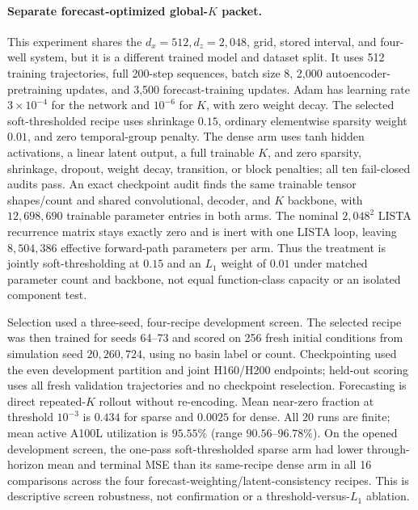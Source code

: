 \paragraph{Separate forecast-optimized global-$K$ packet.}
This experiment shares the $d_x=512,d_z=2{,}048$, grid, stored interval, and
four-well system, but it is a different trained model and dataset split. It
uses 512 training trajectories, full 200-step sequences, batch size 8, 2,000
autoencoder-pretraining updates, and 3,500 forecast-training updates. Adam has
learning rate $3\times10^{-4}$ for the network and $10^{-6}$ for $K$, with
zero weight decay. The selected soft-thresholded recipe uses shrinkage $0.15$, ordinary
elementwise sparsity weight $0.01$, and zero temporal-group penalty. The dense
arm uses tanh hidden activations, a linear latent output, a full trainable $K$,
and zero sparsity, shrinkage, dropout, weight decay, transition, or block
penalties; all ten fail-closed audits pass. An exact checkpoint audit finds
the same trainable tensor shapes/count and shared convolutional, decoder, and
$K$ backbone, with $12{,}698{,}690$ trainable parameter entries in both arms.
The nominal $2{,}048^2$ LISTA recurrence matrix stays exactly zero and is inert
with one LISTA loop, leaving $8{,}504{,}386$ effective forward-path parameters
per arm. Thus the treatment is jointly soft-thresholding at $0.15$ and an
$L_1$ weight of $0.01$ under matched parameter count and backbone, not equal
function-class capacity or an isolated component test.

Selection used a three-seed, four-recipe development screen. The selected
recipe was then trained for seeds 64--73 and scored on 256 fresh initial
conditions from simulation seed $20{,}260{,}724$, using no basin label or
count. Checkpointing used the even development partition and joint H160/H200
endpoints; held-out scoring uses all fresh validation trajectories and no
checkpoint reselection. Forecasting is direct
repeated-$K$ rollout without re-encoding. Mean near-zero fraction at threshold
$10^{-3}$ is $0.434$ for sparse and $0.0025$ for dense. All 20 runs are finite;
mean active A100L utilization is $95.55\%$ (range $90.56$--$96.78\%$).
On the opened development screen, the one-pass soft-thresholded sparse arm had lower through-horizon mean
and terminal MSE than its same-recipe dense arm in all 16 comparisons across
the four forecast-weighting/latent-consistency recipes. This is descriptive
screen robustness, not confirmation or a threshold-versus-$L_1$ ablation.

\begin{table}[tbp]
\centering
\caption{Separate forecast-optimized Allen--Cahn comparison. ``Mean'' averages
field MSE over every forecast state through the horizon; it is not an
unnormalized cumulative sum. Intervals resample paired model seeds. The
one-sided max-$t$ values are a multiplicity sensitivity, not a replacement for
the failed internally frozen four-cell gate.}
\label{tab:allen_cahn_global_k_forecast_optimized}
\resizebox{\textwidth}{!}{}
\end{table}

